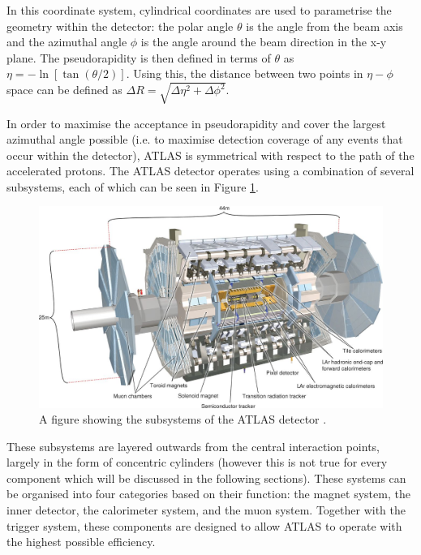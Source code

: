 \documentclass[12pt,a4paper,epsf,portrait,times,epsfig]{article}
\begin{document}
		In this coordinate system, cylindrical coordinates are used to parametrise the geometry within the detector: the polar angle $\theta$  is the angle from the beam axis and the azimuthal angle $\phi$ is the angle around the beam direction in the x-y plane. The pseudorapidity is then defined in terms of $\theta$ as $\eta = - \ln[\tan(\theta/2)]$. Using this, the distance between two points in $\eta-\phi$ space can be defined as $\Delta R =	\sqrt{\Delta\eta^{2}+\Delta\phi^{2}}$. \par
		
		In order to maximise the acceptance in pseudorapidity and cover the largest azimuthal angle possible (i.e. to maximise detection coverage of any events that occur within the detector), ATLAS is symmetrical with respect to the path of the accelerated protons. The	ATLAS detector operates using a combination of several subsystems, each of which can
		be seen in Figure \ref{Fig:ATLASDetector}. \par
		
		\begin{figure}
			\centering
			\includegraphics{ATLAS}
			\caption{A figure showing the subsystems of the ATLAS detector \cite{Article:ATLASDesignPaper}.}
			\label{Fig:ATLASDetector}
		\end{figure}
		
		These subsystems are layered outwards from the central interaction points, largely in the form of concentric cylinders (however this is not true for every component which will be discussed in the following sections). These systems can be	organised into four categories based on their function: the magnet system, the inner detector, the calorimeter system, and the muon system. Together with the trigger system, these components are designed to allow ATLAS to operate with the highest possible efficiency. \par
		
\end{document}
